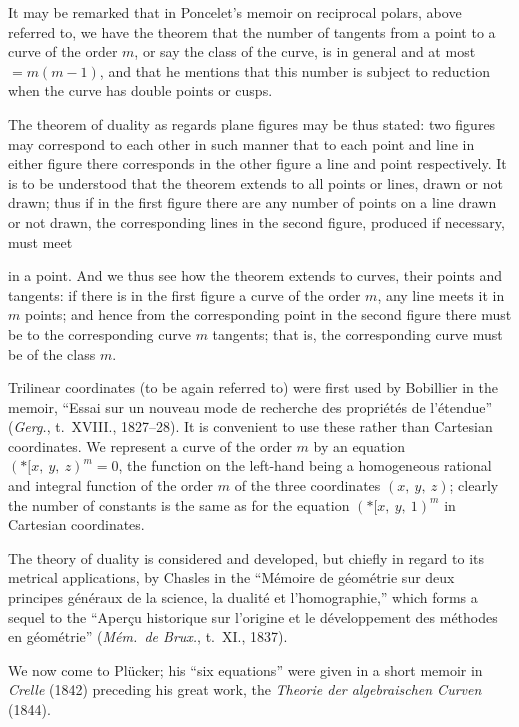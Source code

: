 \documentclass[12pt,a4paper,oneside]{book}
\begin{document}
It may be remarked that in Poncelet's memoir on reciprocal polars, above referred to, we have the theorem that the number of tangents from a point to a curve of the order $m$, or say the class of the curve, is in general and at most $=m(m-1)$, and that he mentions that this number is subject to reduction when the curve has double points or cusps.

The theorem of duality as regards plane figures may be thus stated: two figures may correspond to each other in such manner that to each point and line in either figure there corresponds in the other figure a line and point respectively. It is to be understood that the theorem extends to all points or lines, drawn or not drawn; thus if in the first figure there are any number of points on a line drawn or not drawn, the corresponding lines in the second figure, produced if necessary, must meet

\newpage
in a point. And we thus see how the theorem extends to curves, their points and tangents: if there is in the first figure a curve of the order $m$, any line meets it in $m$ points; and hence from the corresponding point in the second figure there must be to the corresponding curve $m$ tangents; that is, the corresponding curve must be of the class $m$.

Trilinear coordinates (to be again referred to) were first used by Bobillier in the memoir, ``Essai sur un nouveau mode de recherche des propri\'et\'es de l'\'etendue'' (\textit{Gerg.}, t.~XVIII., 1827--28). It is convenient to use these rather than Cartesian coordinates. We represent a curve of the order $m$ by an equation $(*\!\![ x,\ y,\ z)^{m}=0$, the function on the left-hand being a homogeneous rational and integral function of the order $m$ of the three coordinates $(x,\ y,\ z)$; clearly the number of constants is the same as for the equation $(*\!\![ x,\ y,\ 1)^{m}$ in Cartesian coordinates.

The theory of duality is considered and developed, but chiefly in regard to its metrical applications, by Chasles in the ``M\'emoire de g\'eom\'etrie sur deux principes g\'en\'eraux de la science, la dualit\'e et l'homographie,'' which forms a sequel to the ``Aper\c{c}u historique sur l'origine et le d\'eveloppement des m\'ethodes en g\'eom\'etrie'' (\textit{M\'em.\ de Brux.}, t.~XI., 1837).

We now come to Pl\"ucker; his ``six equations'' were given in a short memoir in \textit{Crelle} (1842) preceding his great work, the \textit{Theorie der algebraischen Curven} (1844).
\end{document}
